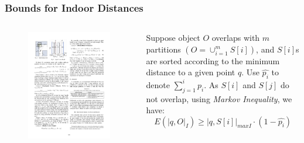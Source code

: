 
\begin{frame}
\frametitle{Bounds for Indoor Distances}


\vspace{10pt}
\begin{columns}[c]

  \begin{figure}[tb]
    \includegraphics[width=\columnwidth]{figures/2-6/2-6-6.pdf}
  \end{figure}

  \begin{lemma}
    Suppose object $O$ overlaps with $m$ partitions $(O = \cup_{i=1}^{m}S[i])$, and $S[i]$s are sorted according to the minimum distance to a given point $q$. Use $\widehat{p_i}$ to denote $\sum_{j=1}^{i}p_i$. As $S[i]$ and $S[j]$ do not overlap, using \emph{Markov Inequality}, we have:
    \begin{equation*}
      E(|q, O|_I) \geq |q,S[i]|_{maxI} \cdot (1 - \widehat{p_i})
    \end{equation*}
  \end{lemma}

\end{columns}

\end{frame}

